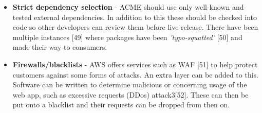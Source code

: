 \begin{itemize}
    \item \textbf{Strict dependency selection} - ACME should use only well-known and tested external dependencies. In addition to this these should be checked
    into code so other developers can review them before live release. There have been multiple instances [49] where packages have been 
    \textit{'typo-squatted'} [50] and made their way to consumers.
    
    \item \textbf{Firewalls/blacklists} - AWS offers services such as WAF [51] to help protect customers against some forms of attacks. An extra layer can be 
    added to this. Software can be written to determine malicious or concerning usage of the web app, such as excessive requests (DDos) attack3[52]. 
    These can then be put onto a blacklist and their requests can be dropped from then on.
  \end{itemize}

\newpage
